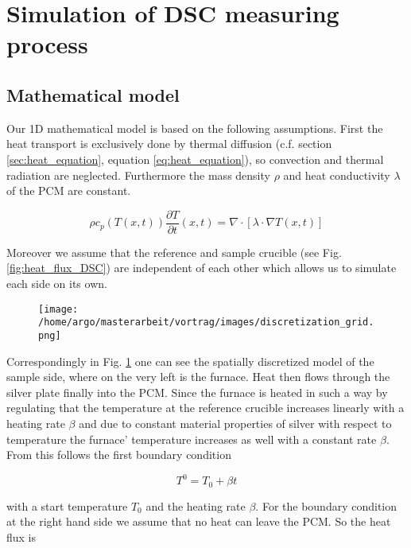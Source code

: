 \documentclass{scrartcl}[12pt, halfparskip]
\numberwithin{equation}{section}
\numberwithin{figure}{section}
\numberwithin{table}{section}
\begin{document}
\newpage
\section{Simulation of DSC measuring process}
\subsection{Mathematical model}

Our 1D mathematical model is based on the following assumptions. First the heat transport is exclusively done by thermal diffusion (c.f. section \ref{sec:heat_equation}, equation \eqref{eq:heat_equation}), so convection and thermal radiation are neglected. Furthermore the mass density $\rho$ and heat conductivity $\lambda$ of the PCM are constant.

\begin{equation}
\rho c_p(T(x,t)) \frac{\partial T}{\partial t}(x,t) = \nabla \cdot \left[\lambda \cdot \nabla T(x,t)  \right]
\label{eq:heat_equation}
\end{equation}

Moreover we assume that the reference and sample crucible (see Fig. \ref{fig:heat_flux_DSC}) are independent of each other which allows us to simulate each side on its own. 

\begin{figure}[H]
	\centering
	\texttt{[image: /home/argo/masterarbeit/vortrag/images/discretization\_grid.png]}
	\caption{}
	\label{fig:mathematical_model_discretized}
\end{figure}

Correspondingly in Fig. \ref{fig:mathematical_model_discretized} one can see the spatially discretized model of the sample side, where on the very left is the furnace. Heat then flows through the silver plate finally into the PCM. Since the furnace is heated in such a way by regulating that the temperature at the reference crucible increases linearly with a heating rate $\beta$ and due to constant material properties of silver with respect to temperature the furnace' temperature increases as well with a constant rate $\beta$. From this follows the first boundary condition

\begin{equation}
	T^0 = T_0 + \beta t
\end{equation}

with a start temperature $T_0$ and the heating rate $\beta$. For the boundary condition at the right hand side we assume that no heat can leave the PCM. So the heat flux is
\end{document}
